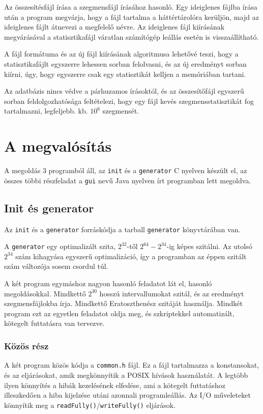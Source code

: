 Az összesítésfájl írása a szegmensfájl írásához hasonló.
Egy ideiglenes fájlba írása után a program megvárja, hogy a fájl tartalma a háttértárolóra kerüljön, majd az ideiglenes fájlt átnevezi a megfelelő névre.
Az ideiglenes fájl kiírásának megvárásával a statisztikafájl váratlan számítógép leállás esetén is visszaállítható.

A fájl formátuma és az új fájl kiírásának algoritmusa lehetővé teszi, hogy a statisztikafájlt egyszerre lehessen sorban felolvasni, és az új eredményt sorban kiírni, úgy, hogy egyszerre csak egy statisztikát kelljen a memóriában tartani.

Az adatbázis nincs védve a párhuzamos írásoktól, és az összesítőfájl egyszerű sorban feldolgozhatósága feltételezi, hogy egy fájl kevés szegmensstatisztikát fog tartalmazni, legfeljebb. kb. $10^6$ szegmensét.

\section{A megvalósítás}

A megoldás 3 programból áll, az \texttt{init} és a \texttt{generator} C nyelven készült el, az összes többi részfeladat a \texttt{gui} nevű Java nyelven írt programban lett megoldva.

\subsection{Init és generator}

Az \texttt{init} és a \texttt{generator} forráskódja a tarball \texttt{generator} könyvtárában van.

A \texttt{generator} egy optimalizált szita, $2^{32}$-től $2^{64}-2^{34}$-ig képes szitálni.
Az utolsó $2^{34}$ szám kihagyása egyszerű optimalizáció, így a programban az éppen szitált szám változója sosem csordul túl.

A két program egymáshoz nagyon hasonló feladatot lát el, hasonló megoldásokkal.
Mindkettő $2^{30}$ hosszú intervallumokat szitál, és az eredményt szegmensfájlokba írja.
Mindkettő Eratoszthenész szitáját használja.
Mindkét program ezt az egyetlen feladatot oldja meg, és szkriptekkel automatizált, kötegelt futtatásra van tervezve.

\subsubsection{Közös rész}

A két program közös kódja a \texttt{common.h} fájl.
Ez a fájl tartalmazza a konstansokat, és az eljárásokat, amik megkönnyítik a POSIX hívások használatát.
A legtöbb ilyen könnyítés a hibák kezelésének elfedése, ami a kötegelt futtatáshoz illeszkedően
a hiba kijelzése utáni azonnali programleállás.
Az I/O műveleteket könnyítik meg a \texttt{readFully()}/\texttt{writeFully()} eljárások.

